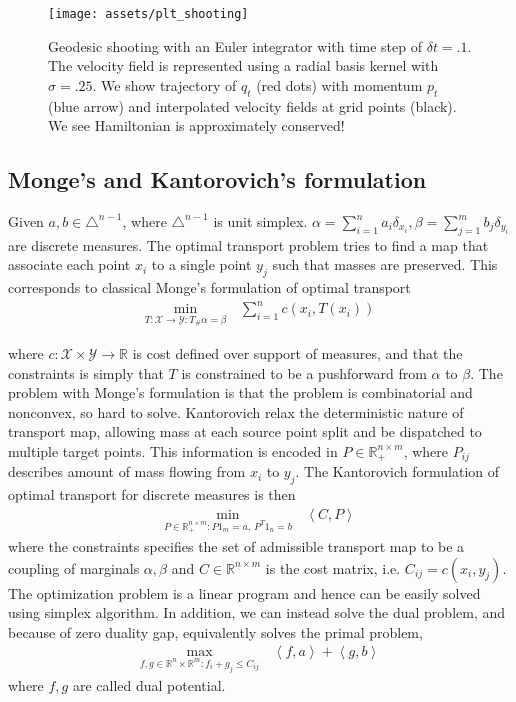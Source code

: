 \documentclass{6838publ}
\newcommand\sX{\ensuremath{\mathcal{X}}}
\newcommand\sY{\ensuremath{\mathcal{Y}}}
\newcommand\R{\ensuremath{\mathbb{R}}} %
\newcommand\inner[2]{\ensuremath{\left< #1, #2 \right>}} %
\begin{document}
\begin{center} 
\begin{figure}[t]
    \texttt{[image: assets/plt\_shooting]} 
    \caption{Geodesic shooting with an Euler integrator with time step of $\delta t = .1$. The velocity field is represented using a radial basis kernel with $\sigma=.25$. We show trajectory of $q_t$ (red dots) with momentum $p_t$ (blue arrow) and interpolated velocity fields at grid points (black). We see Hamiltonian is approximately conserved!}
    \label{fig:plt_shooting}
\end{figure} 
\end{center} 



\subsection{Monge's and Kantorovich's formulation}

Given $a,b \in \triangle^{n-1}$, where $\triangle^{n-1}$ is unit simplex. $\alpha = \sum_{i=1}^n a_i \delta_{x_i}, \beta = \sum_{j=1}^m b_j \delta_{y_i}$ are discrete measures. The optimal transport problem tries to find a map that associate each point $x_i$ to a single point $y_j$ such that masses are preserved. This corresponds to classical Monge's formulation of optimal transport
\begin{align}
    \min_{T:\sX\to\sY: T_{\#}\alpha = \beta}\,
        &\sum_{i=1}^n c(x_i, T(x_i))
\end{align}



where $c:\sX\times\sY \to\R$ is cost defined over support of measures, and that the constraints is simply that $T$ is constrained to be a pushforward from $\alpha$ to $\beta$. The problem with Monge's formulation is that the problem is combinatorial and nonconvex, so hard to solve. Kantorovich relax the deterministic nature of transport map, allowing mass at each source point split and be dispatched to multiple target points. This information is encoded in $P\in\R^{n\times m}_+$, where $P_{ij}$ describes amount of mass flowing from $x_i$ to $y_j$. The Kantorovich formulation of optimal transport for discrete measures is then
\begin{align}
    \min_{P\in\R^{n\times m}_+: P1_m = a,\, P^T1_n = b}\,
        &\inner{C}{P}
\end{align}
where the constraints specifies the set of admissible transport map to be a coupling of marginals $\alpha,\beta$ and $C\in\R^{n\times m}$ is the cost matrix, i.e. $C_{ij} = c(x_i,y_j)$. The optimization problem is a linear program and hence can be easily solved using simplex algorithm. In addition, we can instead solve the dual problem, and because of zero duality gap, equivalently solves the primal problem,
\begin{align}
    \max_{f,g\in\R^n\times\R^m: f_i+g_j \leq C_{ij}}\,
        &\inner{f}{a} + \inner{g}{b} 
\end{align}
where $f,g$ are called dual potential.
\end{document}
